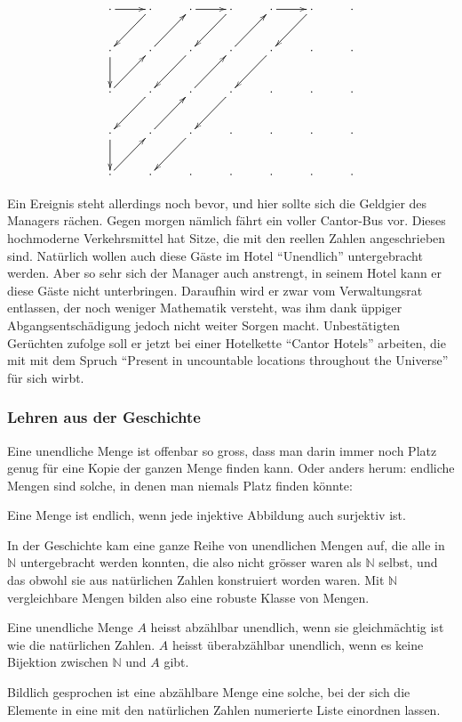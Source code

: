 \[
\xymatrix{
\ar[r]
\cdot	     &\cdot\ar[dl] &\cdot\ar[r] &\cdot\ar[dl]  &\cdot\ar[r] &\cdot\ar[dl] &\cdot
\\
\cdot\ar[d]  &\cdot\ar[ur] &\cdot\ar[dl] &\cdot\ar[ur] &\cdot\ar[dl]&\cdot        &\cdot
\\
\cdot\ar[ur] &\cdot\ar[dl] &\cdot\ar[ur] &\cdot\ar[dl] &\cdot       &\cdot        &\cdot
\\
\cdot\ar[d]  &\cdot\ar[ur] &\cdot\ar[dl] &\cdot        &\cdot       &\cdot        &\cdot
\\
\cdot\ar[ur] &\cdot        &\cdot        &\cdot        &\cdot       &\cdot        &\cdot
}
\]

Ein Ereignis steht allerdings noch bevor, und hier sollte sich die
Geldgier des Managers rächen. Gegen morgen nämlich fährt
ein voller Cantor-Bus vor. Dieses hochmoderne Verkehrsmittel hat Sitze,
die mit den reellen Zahlen angeschrieben sind. Natürlich wollen auch
diese Gäste im Hotel ``Unendlich'' untergebracht werden. Aber so sehr
sich der Manager auch anstrengt, in seinem Hotel kann er diese
Gäste nicht unterbringen. Daraufhin wird er zwar vom Verwaltungsrat
entlassen, der noch weniger Mathematik versteht, was ihm dank üppiger
Abgangsentschädigung jedoch nicht weiter Sorgen macht. Unbestätigten
Gerüchten zufolge soll er jetzt bei einer Hotelkette ``Cantor Hotels''
arbeiten, die mit mit dem Spruch ``Present in uncountable locations
throughout the Universe'' für sich wirbt.

\subsubsection{Lehren aus der Geschichte}
Eine unendliche Menge ist offenbar so gross, dass man darin immer noch
Platz genug für eine Kopie der ganzen Menge finden kann. Oder anders
herum: endliche Mengen sind solche, in denen man niemals Platz finden
könnte:

\begin{satz}
Eine Menge ist endlich, wenn jede injektive Abbildung auch surjektiv ist.
\end{satz}

In der Geschichte kam eine ganze Reihe von unendlichen Mengen auf, die
alle in $\mathbb N$ untergebracht werden konnten, die also nicht
grösser waren als $\mathbb N$ selbst, und das obwohl sie aus natürlichen
Zahlen konstruiert worden waren. Mit $\mathbb N$ vergleichbare Mengen
bilden also eine robuste Klasse von Mengen.

\begin{definition}
Eine unendliche Menge $A$ heisst abzählbar unendlich, wenn sie
gleichmächtig ist wie die natürlichen Zahlen. $A$ heisst
überabzählbar unendlich, wenn es keine Bijektion zwischen
$\mathbb N$ und $A$ gibt.
\end{definition}
Bildlich gesprochen ist eine abzählbare Menge eine solche,
bei der sich die Elemente in eine mit den natürlichen Zahlen numerierte
Liste einordnen lassen.

